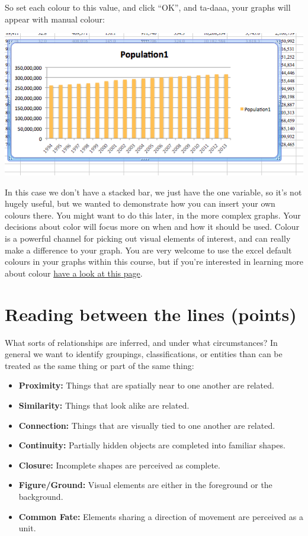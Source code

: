 \documentclass[
]{book}
\providecommand{\tightlist}{%
  \setlength{\itemsep}{0pt}\setlength{\parskip}{0pt}}
\begin{document}
So set each colour to this value, and click ``OK'', and ta-daaa, your graphs will appear with manual colour:

\includegraphics{imgs/manual_fill_6.png}

In this case we don't have a stacked bar, we just have the one variable, so it's not hugely useful, but we wanted to demonstrate how you can insert your own colours there. You might want to do this later, in the more complex graphs. Your decisions about color will focus more on when and how it should be used. Colour is a powerful channel for picking out visual elements of interest, and can really make a difference to your graph. You are very welcome to use the excel default colours in your graphs within this course, but if you're interested in learning more about colour \href{https://lisacharlotterost.github.io/2016/04/22/Colors-for-DataVis/}{have a look at this page}.

\hypertarget{reading-between-the-lines-points}{%
\section{Reading between the lines (points)}\label{reading-between-the-lines-points}}

What sorts of relationships are inferred, and under what circumstances? In general we want to identify groupings, classifications, or entities than can be treated as the same thing or part of the same thing:

\begin{itemize}
\tightlist
\item
  \textbf{Proximity:} Things that are spatially near to one another are related.
\item
  \textbf{Similarity:} Things that look alike are related.
\item
  \textbf{Connection:} Things that are visually tied to one another are related.
\item
  \textbf{Continuity:} Partially hidden objects are completed into familiar shapes.
\item
  \textbf{Closure:} Incomplete shapes are perceived as complete.
\item
  \textbf{Figure/Ground:} Visual elements are either in the foreground or the background.
\item
  \textbf{Common Fate:} Elements sharing a direction of movement are perceived as a unit.
\end{itemize}
\end{document}
